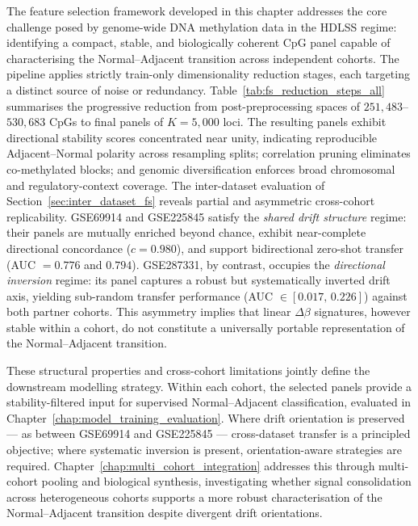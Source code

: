 The feature selection framework developed in this chapter addresses
the core challenge posed by genome-wide DNA methylation data in the
HDLSS regime: identifying a compact, stable, and biologically coherent
CpG panel capable of characterising the Normal--Adjacent transition
across independent cohorts.
The pipeline applies strictly train-only dimensionality reduction
stages, each targeting a distinct source of noise or redundancy.
Table~\ref{tab:fs_reduction_steps_all} summarises the progressive
reduction from post-preprocessing spaces of $251{,}483$--$530{,}683$
CpGs to final panels of $K = 5{,}000$ loci. The resulting panels
exhibit directional stability scores concentrated near unity,
indicating reproducible Adjacent--Normal polarity across resampling
splits; correlation pruning eliminates co-methylated blocks; and
genomic diversification enforces broad chromosomal and
regulatory-context coverage.
The inter-dataset evaluation of Section~\ref{sec:inter_dataset_fs}
reveals partial and asymmetric cross-cohort replicability.
GSE69914 and GSE225845 satisfy the \emph{shared drift structure}
regime: their panels are mutually enriched beyond chance, exhibit
near-complete directional concordance ($c = 0.980$), and support
bidirectional zero-shot transfer (AUC $= 0.776$ and $0.794$).
GSE287331, by contrast, occupies the \emph{directional inversion}
regime: its panel captures a robust but systematically inverted
drift axis, yielding sub-random transfer performance
(AUC $\in [0.017,\, 0.226]$) against both partner cohorts.
This asymmetry implies that linear $\Delta\beta$ signatures,
however stable within a cohort, do not constitute a universally
portable representation of the Normal--Adjacent transition.

These structural properties and cross-cohort limitations jointly
define the downstream modelling strategy. Within each cohort, the
selected panels provide a stability-filtered input for supervised
Normal--Adjacent classification, evaluated in
Chapter~\ref{chap:model_training_evaluation}. Where drift
orientation is preserved — as between GSE69914 and GSE225845 —
cross-dataset transfer is a principled objective; where systematic
inversion is present, orientation-aware strategies are required.
Chapter~\ref{chap:multi_cohort_integration} addresses this through
multi-cohort pooling and biological synthesis, investigating whether
signal consolidation across heterogeneous cohorts supports a more
robust characterisation of the Normal--Adjacent transition despite
divergent drift orientations.